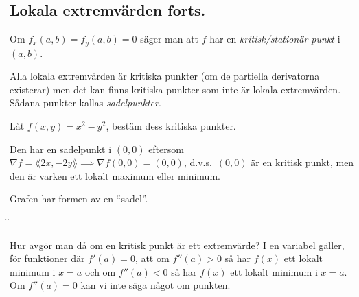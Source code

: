 \documentclass[a4paper]{article}
\begin{document}
\providecommand\fname{}
\renewcommand\fname{19-09-17}

\subsection{Lokala extremvärden forts.}
\begin{defn}
    Om \(
        f_x(a,b) = f_y(a,b) = 0
    \) säger man att \(
        f
    \) har en \emph{kritisk/stationär punkt} i \(
        (a,b)
    \). 
\end{defn}

Alla lokala extremvärden är kritiska punkter (om de partiella derivatorna 
existerar) men det kan finns kritiska punkter som inte är lokala extremvärden.
Sådana punkter kallas \emph{sadelpunkter}.

\begin{ex}
    Låt \(
        f(x,y) = x^2-y^2
    \), bestäm dess kritiska punkter.

    Den har en sadelpunkt i \(
        (0,0)
    \) eftersom \(
        \nabla f = \lang 2x, -2y\rang \implies \nabla f(0,0) = (0,0)
    \), d.v.s.\ \(
        (0,0)
    \) är en kritisk punkt, men den är varken ett lokalt maximum eller minimum.

    Grafen har formen av en \enquote{sadel}.

    \f
\end{ex}

Hur avgör man då om en kritisk punkt är ett extremvärde? I en variabel 
gäller, för funktioner där \(
    f'(a) = 0
\), att om \(
    f''(a) > 0
\) så har \(
    f(x)
\) ett lokalt minimum i \(
    x=a
\) och om \(
    f''(a) < 0
\) så har \(
    f(x)
\) ett lokalt minimum i \(
    x=a
\). Om \(
    f''(a) = 0
\) kan vi inte säga något om punkten.
\end{document}

